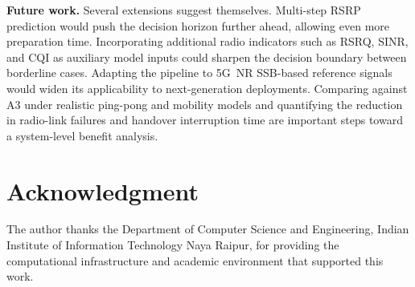 \documentclass[journal]{IEEEtran}
\begin{document}
\textbf{Future work.}
Several extensions suggest themselves. Multi-step RSRP prediction would
push the decision horizon further ahead, allowing even more preparation
time. Incorporating additional radio indicators such as RSRQ, SINR, and
CQI as auxiliary model inputs could sharpen the decision boundary between
borderline cases. Adapting the pipeline to 5G~NR SSB-based reference
signals would widen its applicability to next-generation deployments.
Comparing against A3 under realistic ping-pong and mobility models and
quantifying the reduction in radio-link failures and handover interruption
time are important steps toward a system-level benefit analysis.

\section*{Acknowledgment}
The author thanks the Department of Computer Science and Engineering,
Indian Institute of Information Technology Naya Raipur, for providing
the computational infrastructure and academic environment that supported
this work.
\end{document}
